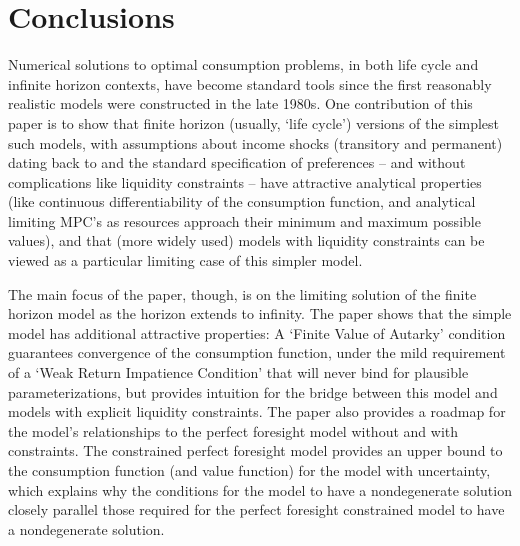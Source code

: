 \documentclass[BufferStockTheory]{subfiles}
\begin{document}

\hypertarget{Conclusions}{}
\section{Conclusions}

Numerical solutions to optimal consumption problems, in both life cycle and infinite horizon contexts, have become standard tools since the first reasonably realistic models were constructed in the late 1980s. One contribution of this paper is to show that finite horizon (usually, `life cycle') versions of the simplest such models, with assumptions about income shocks (transitory and permanent) dating back to \cite{friedmanATheory} and the standard specification of preferences -- and without complications like liquidity constraints -- have attractive analytical properties (like continuous differentiability of the consumption function, and analytical limiting MPC's as resources approach their minimum and maximum possible values), and that (more widely used) models with liquidity constraints can be viewed as a particular limiting case of this simpler model.

The main focus of the paper, though, is on the limiting solution of the finite horizon model as the horizon extends to infinity.  The paper shows that the simple model has additional attractive properties: A \href{https://econ-ark.github.io/BufferStockTheory#FVAC}{}`Finite Value of Autarky' condition guarantees convergence of the consumption function, under the mild requirement of a `Weak Return Impatience Condition' that will never bind for plausible parameterizations, but provides intuition for the bridge between this model and models with explicit liquidity constraints. The paper also provides a roadmap for the model's relationships to the perfect foresight model without and with constraints.  The constrained perfect foresight model provides an upper bound to the consumption function (and value function) for the model with uncertainty, which explains why the conditions for the model to have a nondegenerate solution closely parallel those required for the perfect foresight constrained model to have a nondegenerate solution.
\end{document}
